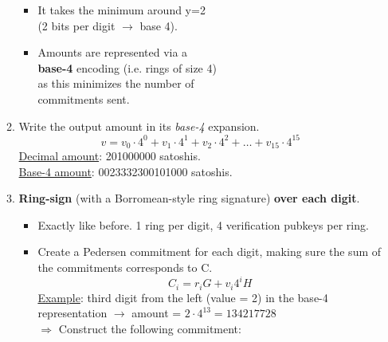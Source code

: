 \documentclass[10.5pt,compress]{beamer}
\begin{document}
\begin{frame}[allowframebreaks]
\begin{enumerate}
\begin{enumerate}
\begin{minipage}{.40\textwidth}
                \end{minipage}%
                \begin{minipage}{.60\textwidth}
                \begin{itemize}
                    \item It takes the minimum around y=2 \\(2 bits per digit $\rightarrow$ base 4).
                    \item Amounts are represented via a\\ \textbf{base-4} encoding (i.e. rings of size 4)\\ as this minimizes the number of\\ commitments sent.
                \end{itemize}
                \end{minipage}%
            \framebreak
            \item Write the output amount in its \textit{base-4} expansion.
            \begin{equation*}
                v = v_0\cdot4^0 + v_1\cdot4^1 + v_2\cdot4^2 + \dots + v_{15}\cdot4^{15}
            \end{equation*}
            \underline{Decimal amount}: 201000000 satoshis.\\
            \underline{Base-4 amount}: 0023332300101000 satoshis.
            \item \textbf{Ring-sign} (with a Borromean-style ring signature) \textbf{over each digit}.
            \begin{itemize}
                \item Exactly like before. 1 ring per digit, 4 verification pubkeys per ring.
                \item Create a Pedersen commitment for each digit, making sure the sum of the commitments corresponds to C. 
                \begin{equation*}
                    C_i = r_iG + v_i4^iH
                \end{equation*}
                \underline{Example}: third digit from the left (value = 2) in the base-4 representation $\rightarrow$ amount = $2\cdot4^{13} = 134217728$\\
                $\Rightarrow$ Construct the following commitment:
                \begin{equation*}

\end{equation*}
\end{itemize}
\end{enumerate}
\end{enumerate}
\end{frame}
\end{document}

